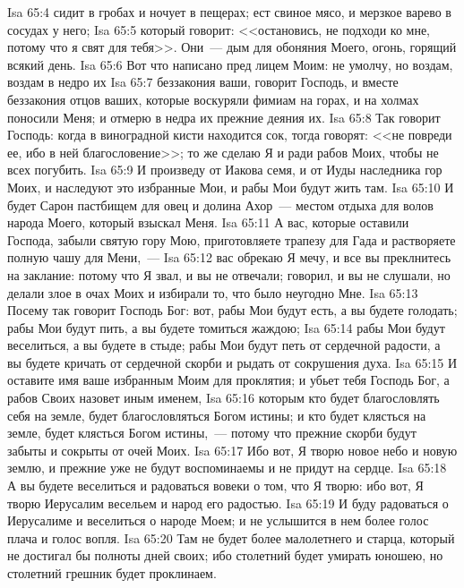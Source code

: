 \vs Isa 65:4 сидит в гробах и ночует в пещерах; ест свиное мясо, и мерзкое варево в сосудах у него;
\vs Isa 65:5 который говорит: <<остановись, не подходи ко мне, потому что я свят для тебя>>. Они~--- дым для обоняния Моего, огонь, горящий всякий день.
\vs Isa 65:6 Вот что написано пред лицем Моим: не умолчу, но воздам, воздам в недро их
\vs Isa 65:7 беззакония ваши, говорит Господь, и вместе беззакония отцов ваших, которые воскуряли фимиам на горах, и на холмах поносили Меня; и отмерю в недра их прежние деяния их.
\rsbpar\vs Isa 65:8 Так говорит Господь: когда в виноградной кисти находится сок, тогда говорят: <<не повреди ее, ибо в ней благословение>>; то же сделаю Я и ради рабов Моих, чтобы не всех погубить.
\vs Isa 65:9 И произведу от Иакова семя, и от Иуды наследника гор Моих, и наследуют это избранные Мои, и рабы Мои будут жить там.
\vs Isa 65:10 И будет Сарон пастбищем для овец и долина Ахор~--- местом отдыха для волов народа Моего, который взыскал Меня.
\vs Isa 65:11 А вас, которые оставили Господа, забыли святую гору Мою, приготовляете трапезу для Гада и растворяете полную чашу для Мени,~---
\vs Isa 65:12 вас обрекаю Я мечу, и все вы преклнитесь на заклание: потому что Я звал, и вы не отвечали; говорил, и вы не слушали, но делали злое в очах Моих и избирали то, что было неугодно Мне.
\vs Isa 65:13 Посему так говорит Господь Бог: вот, рабы Мои будут есть, а вы будете голодать; рабы Мои будут пить, а вы будете томиться жаждою;
\vs Isa 65:14 рабы Мои будут веселиться, а вы будете в стыде; рабы Мои будут петь от сердечной радости, а вы будете кричать от сердечной скорби и рыдать от сокрушения духа.
\vs Isa 65:15 И оставите имя ваше избранным Моим для проклятия; и убьет тебя Господь Бог, а рабов Своих назовет иным именем,
\vs Isa 65:16 которым кто будет благословлять себя на земле, будет благословляться Богом истины; и кто будет клясться на земле, будет клясться Богом истины,~--- потому что прежние скорби будут забыты и сокрыты от очей Моих.
\vs Isa 65:17 Ибо вот, Я творю новое небо и новую землю, и прежние уже не будут воспоминаемы и не придут на сердце.
\vs Isa 65:18 А вы будете веселиться и радоваться вовеки о том, что Я творю: ибо вот, Я творю Иерусалим весельем и народ его радостью.
\vs Isa 65:19 И буду радоваться о Иерусалиме и веселиться о народе Моем; и не услышится в нем более голос плача и голос вопля.
\vs Isa 65:20 Там не будет более малолетнего и старца, который не достигал бы полноты дней своих; ибо столетний будет умирать юношею, но столетний грешник будет проклинаем.
